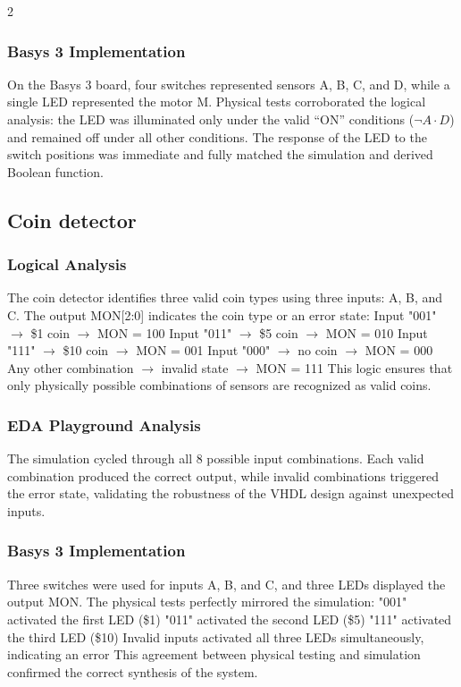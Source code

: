 \documentclass{article}
\begin{document}
\begin{multicols}{2}
\subsubsection{Basys 3 Implementation}
On the Basys 3 board, four switches represented sensors A, B, C, and D, while a single LED represented the motor M. Physical tests corroborated the logical analysis: the LED was illuminated only under the valid “ON” conditions ($\neg A \cdot D$) and remained off under all other conditions. The response of the LED to the switch positions was immediate and fully matched the simulation and derived Boolean function. 

\subsection{Coin detector}
\subsubsection{Logical Analysis}
The coin detector identifies three valid coin types using three inputs: A, B, and C. The output MON[2:0] indicates the coin type or an error state: 
Input "001" $\to$ \$1 coin $\to$ MON = 100 
Input "011" $\to$ \$5 coin $\to$ MON = 010 
Input "111" $\to$ \$10 coin $\to$ MON = 001 
Input "000" $\to$ no coin $\to$ MON = 000 
Any other combination $\to$ invalid state $\to$ MON = 111 
This logic ensures that only physically possible combinations of sensors are recognized as valid coins. 

\subsubsection{EDA Playground Analysis}
The simulation cycled through all 8 possible input combinations. Each valid combination produced the correct output, while invalid combinations triggered the error state, validating the robustness of the VHDL design against unexpected inputs. 

\subsubsection{Basys 3 Implementation}
Three switches were used for inputs A, B, and C, and three LEDs displayed the output MON. The physical tests perfectly mirrored the simulation: 
"001" activated the first LED (\$1) 
"011" activated the second LED (\$5) 
"111" activated the third LED (\$10) 
Invalid inputs activated all three LEDs simultaneously, indicating an error 
This agreement between physical testing and simulation confirmed the correct synthesis of the system. 


\end{multicols}
\end{document}
